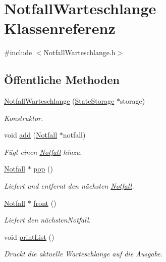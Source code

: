 \hypertarget{classNotfallWarteschlange}{}\section{Notfall\+Warteschlange Klassenreferenz}
\label{classNotfallWarteschlange}


{\ttfamily \#include $<$Notfall\+Warteschlange.\+h$>$}

\subsection*{Öffentliche Methoden}
\begin{DoxyCompactItemize}
\item 
\hyperlink{classNotfallWarteschlange_a6044cf77e4e6485aa182c03d03da7cd3}{Notfall\+Warteschlange} (\hyperlink{classStateStorage}{State\+Storage} $\ast$storage)
\begin{DoxyCompactList}\small\item\em Konstruktor. \end{DoxyCompactList}\item 
void \hyperlink{classNotfallWarteschlange_adbe91265e4e4fa6b075714aaa6287fc6}{add} (\hyperlink{classNotfall}{Notfall} $\ast$notfall)
\begin{DoxyCompactList}\small\item\em Fügt einen \hyperlink{classNotfall}{Notfall} hinzu. \end{DoxyCompactList}\item 
\hyperlink{classNotfall}{Notfall} $\ast$ \hyperlink{classNotfallWarteschlange_af941293bb468dccf5283bdba4d3ad664}{pop} ()
\begin{DoxyCompactList}\small\item\em Liefert und entfernt den nächsten \hyperlink{classNotfall}{Notfall}. \end{DoxyCompactList}\item 
\hyperlink{classNotfall}{Notfall} $\ast$ \hyperlink{classNotfallWarteschlange_ab541fb2019e971af7fb45b995c9c8418}{front} ()
\begin{DoxyCompactList}\small\item\em Liefert den nächsten\+Notfall. \end{DoxyCompactList}\item 
void \hyperlink{classNotfallWarteschlange_aab9cd1910a42b4c6a563daec7f49cddd}{print\+List} ()\hypertarget{classNotfallWarteschlange_aab9cd1910a42b4c6a563daec7f49cddd}{}\label{classNotfallWarteschlange_aab9cd1910a42b4c6a563daec7f49cddd}

\begin{DoxyCompactList}\small\item\em Druckt die aktuelle Warteschlange auf die Ausgabe. \end{DoxyCompactList}\end{DoxyCompactItemize}


